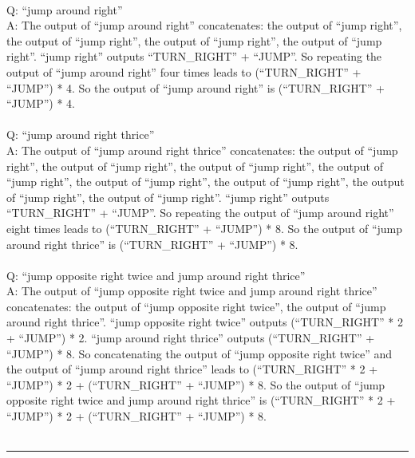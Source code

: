{\\
Q: ``jump around right'' \\
A: The output of ``jump around right'' concatenates: the output of ``jump right'', the output of ``jump right'', the output of ``jump right'', the output of ``jump right''. ``jump right'' outputs ``TURN\_RIGHT'' + ``JUMP''. So repeating the output of ``jump around right'' four times leads to (``TURN\_RIGHT'' + ``JUMP'') * 4. So the output of ``jump around right'' is (``TURN\_RIGHT'' + ``JUMP'') * 4. \\
\\
Q: ``jump around right thrice'' \\
A: The output of ``jump around right thrice'' concatenates: the output of ``jump right'', the output of ``jump right'', the output of ``jump right'', the output of ``jump right'', the output of ``jump right'', the output of ``jump right'', the output of ``jump right'', the output of ``jump right''. ``jump right'' outputs ``TURN\_RIGHT'' + ``JUMP''. So repeating the output of ``jump around right'' eight times leads to (``TURN\_RIGHT'' + ``JUMP'') * 8. So the output of ``jump around right thrice'' is (``TURN\_RIGHT'' + ``JUMP'') * 8. \\
\\
Q: ``jump opposite right twice and jump around right thrice'' \\
A: The output of ``jump opposite right twice and jump around right thrice'' concatenates: the output of ``jump opposite right twice'', the output of ``jump around right thrice''. ``jump opposite right twice'' outputs (``TURN\_RIGHT'' * 2 + ``JUMP'') * 2. ``jump around right thrice'' outputs (``TURN\_RIGHT'' + ``JUMP'') * 8. So concatenating the output of ``jump opposite right twice'' and the output of ``jump around right thrice'' leads to (``TURN\_RIGHT'' * 2 + ``JUMP'') * 2 + (``TURN\_RIGHT'' + ``JUMP'') * 8. So the output of ``jump opposite right twice and jump around right thrice'' is (``TURN\_RIGHT'' * 2 + ``JUMP'') * 2 + (``TURN\_RIGHT'' + ``JUMP'') * 8. \\
\\
\hrule \bigskip
}

